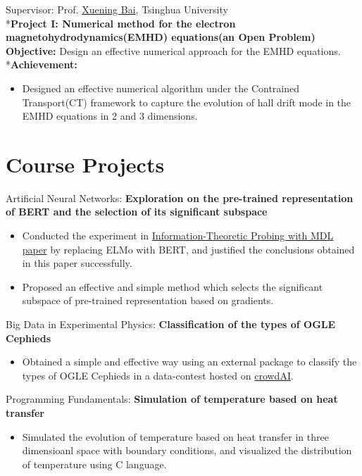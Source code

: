 \documentclass{resume}
\begin{document}
Supervisor: Prof. \href{http://astro.tsinghua.edu.cn/~xbai/}{Xuening Bai}, Tsinghua University
\\*\textbf{Project I: Numerical method for the electron magnetohydrodynamics(EMHD) equations(an Open Problem)}
\textbf{Objective:} Design an effective numerical approach for the EMHD equations.
\\*\textbf{Achievement:}
\begin{itemize}
    \item Designed an effective numerical algorithm under the Contrained Transport(CT) framework to capture the evolution of hall drift mode in the EMHD equations in 2 and 3 dimensions.
\end{itemize}


\section{Course Projects}
Artificial Neural Networks: \textbf{Exploration on the pre-trained representation of BERT and the selection of its significant subspace}
\begin{itemize}
    \item Conducted the experiment in \href{https://lena-voita.github.io/posts/mdl_probes.html}{Information-Theoretic Probing with MDL paper} by replacing ELMo with BERT, and justified the conclusions obtained in this paper successfully.
    \item Proposed an effective and simple method which selects the significant subspace of pre-trained representation based on gradients.
\end{itemize}

Big Data in Experimental Physics: \textbf{Classification of the types of OGLE Cephieds}
\begin{itemize}
    \item Obtained a simple and effective way using an external package to classify the types of OGLE Cephieds in a data-contest hosted on \href{https://data-contest.applysquare.com/challenges/pd2020}{crowdAI}.
\end{itemize}

Programming Fundamentals: \textbf{Simulation of temperature based on heat transfer}
\begin{itemize}
    \item Simulated the evolution of temperature based on heat transfer in three dimensioanl space with boundary conditions, and visualized the distribution of temperature using C language.
\end{itemize}
\end{document}
